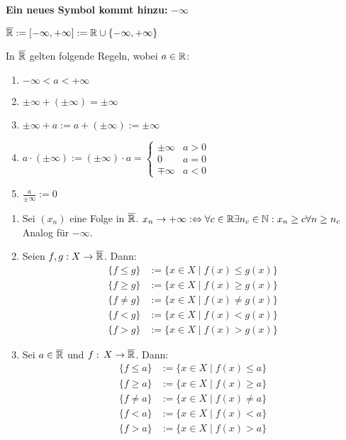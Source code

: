 \documentclass[a4paper,twoside,DIV15,BCOR12mm,chapterprefix=true,headings=onelinechapter]{scrbook}
\begin{document}
\textbf{Ein neues Symbol kommt hinzu:} \(-\infty\){

\(\overline{\mathbb{R}}:=[-\infty,+\infty]:=\mathbb{R}\cup\{-\infty,+\infty\}\)

In \(\overline{\mathbb{R}}\) gelten folgende Regeln, wobei \(a\in\mathbb{R}\):
\begin{enumerate}
\item \(-\infty<a<+\infty\)
\item \(\pm\infty+(\pm\infty)=\pm\infty\)
\item \(\pm\infty+a:=a+(\pm\infty):=\pm\infty\)
\item \(a\cdot(\pm\infty):=(\pm\infty)\cdot a=\begin{cases}\pm\infty&a>0\\
    0&a=0\\\mp\infty&a<0\end{cases}\)
\item \(\frac{a}{\pm\infty}:=0\)
\end{enumerate}
}

\begin{definition}
\begin{enumerate}
\item Sei \((x_{n})\) eine Folge in \(\overline{\mathbb{R}}\). \(x_{n}\rightarrow+\infty:\Leftrightarrow\forall c\in\mathbb{R}\exists n_{c}\in\mathbb{N}:x_{n}\geq c\forall n\geq n_{c}\)\\
Analog f\"ur \(-\infty\).
\item Seien \(f,g: X\to\overline{\mathbb{R}}\). Dann:
\begin{align*}
    \{f\leq g\}&:=\{x\in X\mid f(x)\leq g(x)\}\\
    \{f\geq g\}&:=\{x\in X\mid f(x)\geq g(x)\}\\
    \{f\neq g\}&:=\{x\in X\mid f(x)\neq g(x)\}\\
    \{f<g\}&:=\{x\in X\mid f(x)<g(x)\}\\
    \{f>g\}&:=\{x\in X\mid f(x)>g(x)\}
\end{align*}
\item Sei \(a\in\overline{\mathbb{R}}\) und \(f:\,X\to\overline{\mathbb{R}}\). Dann:
\begin{align*}
    \{f\leq a\}&:=\{x\in X\mid f(x)\leq a\}\\
    \{f\geq a\}&:=\{x\in X\mid f(x)\geq a\}\\
    \{f\neq a\}&:=\{x\in X\mid f(x)\neq a\}\\
    \{f<a\}&:=\{x\in X\mid f(x)<a\}\\
    \{f>a\}&:=\{x\in X\mid f(x)>a\}
\end{align*}
\end{enumerate}
\end{definition}
\end{document}
